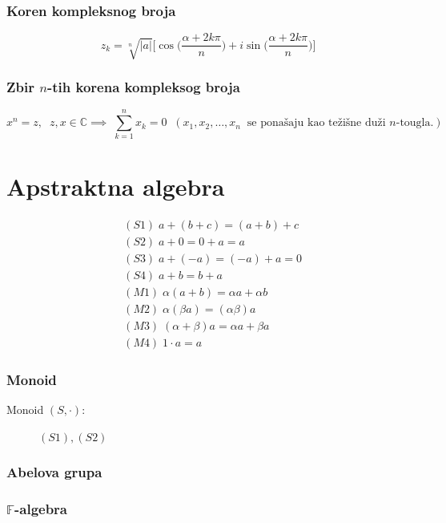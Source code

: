 \documentclass[a4paper,12pt,twoside]{report}
\numberwithin{algorithm}{section}
\begin{document}
\subsection{Koren kompleksnog broja}
\[ 
    z_k = \sqrt[n]{|a|} \bigg[\cos\bigg(\frac{\alpha+2k\pi}{n}\bigg) + i \sin\bigg(\frac{\alpha+2k\pi}{n}\bigg)\bigg]
\]
\subsection{Zbir $n$-tih korena kompleksog broja}
\[
    x^n = z, \;\;z,x\in \mathbb{C} \implies  \; \sum^n_{k=1} x_k=0 \;\; (x_1, x_2, \dots, x_n \;\; \text{se ponašaju kao težišne duži $n$-tougla}.)
\]

\chapter{Apstraktna algebra}
\noindent
\begin{equation*}
    \begin{aligned}
        &(S1)\; a+(b+c) = (a+b)+c \\
        &(S2)\; a + 0 = 0 + a = a \\
        &(S3)\; a + (-a) = (-a) + a = 0 \\
        &(S4)\; a + b = b + a \\
        &(M1)\; \alpha(a + b) = \alpha a + \alpha b\\
        &(M2)\; \alpha (\beta a) = (\alpha \beta)a \\
        &(M3)\; (\alpha + \beta) a = \alpha a + \beta a \\
        &(M4)\; 1 \cdot a = a
    \end{aligned}
\end{equation*}
\subsection{Monoid}
\label{monoid}
\begin{description}
    \item[Monoid $(S, \cdot)$:] $(S1), (S2)$  
\end{description}
\subsection{Abelova grupa}
\label{abelovaGrupa}
\subsection{$\mathbb{F}$-algebra}
\label{F-algebra}
\end{document}
